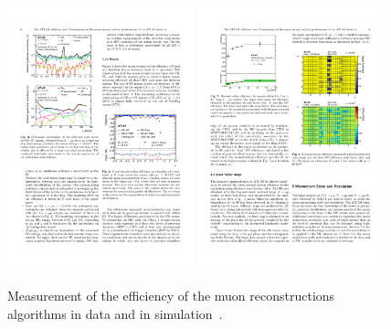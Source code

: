 \begin{figure}[tp]
  \centering
  \includegraphics[width=0.48\textwidth]{figures/performance/muon-efficiency}
  \includegraphics[width=0.48\textwidth]{figures/performance/muon-efficiency-etaphi}
  \caption{Measurement of the efficiency of the muon reconstructions algorithms in data and in simulation~\cite{PERF-2014-05}.}
  \label{fig:objects-muon-efficiency}
\end{figure}
